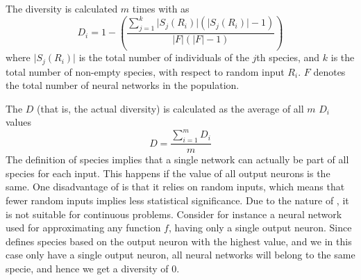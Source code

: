 The diversity is calculated $m$ times with \dia{} as
%
\begin{equation*}\label{eq:sdi}
  D_i = 1 - \left(\frac{\sum_{j=1}^{k}\lvert S_j\left(R_i\right)\rvert\left(\lvert S_j\left(R_i\right)\rvert - 1\right)}{\lvert F\rvert \left(\lvert F\rvert - 1\right)}\right) 
\end{equation*}
%
where $\lvert S_j(R_i)\rvert$ is the total number of individuals of the $j$th species, and $k$ is the total number of non-empty species, with respect to random input $R_i$. %
$F$ denotes the total number of neural networks in the population. 

The \dia{} $D$ (that is, the actual diversity) is calculated as the average of all $m$ $D_i$ values
%
\[D =\frac{\sum_{i=1}^m{D_i}}{m}\]
%
The definition of species implies that a single network can actually be part of all species for each input.
This happens if the value of all output neurons is the same.
One disadvantage of \dia{} is that it relies on random inputs, which means that fewer random inputs implies less statistical significance.
Due to the nature of \dia, it is not suitable for continuous problems.
Consider for instance a neural network used for approximating any function $f$, having only a single output neuron.
Since \dia defines species based on the output neuron with the highest value, and we in this case only have a single output neuron, all neural networks will belong to the same specie, and hence we get a diversity of 0.  
